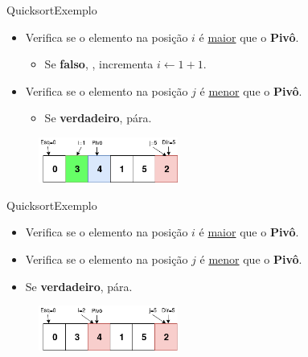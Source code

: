 \documentclass[aspectratio=169]{beamer}
\begin{document}
\begin{frame}{Quicksort}{Exemplo}
\begin{itemize}
 \item Verifica se o elemento na posição $i$ é \underline{maior} que o {\bf Pivô}.
 \begin{itemize}
 \item Se {\bf falso}, , incrementa $i \leftarrow 1 + 1$.
 \end{itemize} 
 \item Verifica se o elemento na posição $j$ é \underline{menor} que o {\bf Pivô}.
 \begin{itemize}
 \item Se {\bf verdadeiro}, pára.
 \end{itemize}
\end{itemize}

\begin{figure}[!h]
  \centering
  \includegraphics[width=130pt]{imgs/quick/quick17.png}
  \label{fig_quick17}
\end{figure}
\end{frame}


\begin{frame}{Quicksort}{Exemplo}
\begin{itemize}
 \item Verifica se o elemento na posição $i$ é \underline{maior} que o {\bf Pivô}. 
 \item Verifica se o elemento na posição $j$ é \underline{menor} que o {\bf Pivô}.
 \item Se {\bf verdadeiro}, pára.
\end{itemize}

\begin{figure}[!h]
  \centering
  \includegraphics[width=130pt]{imgs/quick/quick18.png}
  \label{fig_quick18}
\end{figure}
\end{frame}
\end{document}
